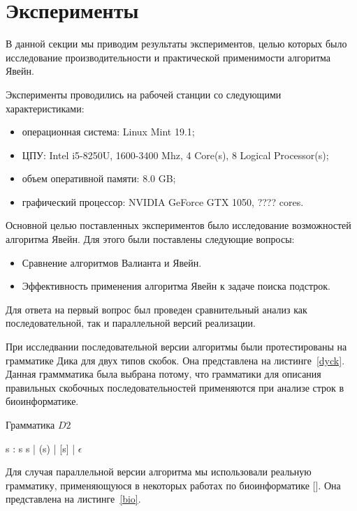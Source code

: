 \documentclass[14pt]{matmex-diploma-custom}
\begin{document}
\section{Эксперименты}

В данной секции мы приводим результаты экспериментов, целью которых было исследование производительности и практической применимости алгоритма Явейн.

Эксперименты проводились на рабочей станции со следующими характеристиками:
\begin{itemize}
    \item операционная система: Linux Mint 19.1;
    \item ЦПУ: Intel i5-8250U, 1600-3400 Mhz, 4 Core(s), 8 Logical Processor(s);
    \item объем оперативной памяти: 8.0 GB;
    \item графический процессор: NVIDIA GeForce GTX 1050, ???? cores.
\end{itemize}

Основной целью поставленных экспериментов было исследование возможностей алгоритма Явейн.
Для этого были поставлены следующие вопросы:

\begin{itemize}
    \item Сравнение алгоритмов Валианта и Явейн.
    \item Эффективность применения алгоритма Явейн к задаче поиска подстрок.
\end{itemize}

Для ответа на первый вопрос был проведен сравнительный анализ как последовательной, так и параллельной версий реализации. 

При исследвании последовательной версии алгоритмы были протестированы на грамматике Дика для двух типов скобок. Она представлена на листинге~\ref{dyck}. Данная граммматика была выбрана потому, что грамматики для описания правильных скобочных последовательностей применяются при анализе строк в биоинформатике. 

\begin{listing}
\caption{Грамматика $D2$}

\quad\quad\quad\quad\quad\quad\quad\quad\quad\quad\quad\quad s : s s  |  (s) |  [s]  |  $\epsilon$

\label{dyck}
\end{listing} 

Для случая параллельной версии алгоритма мы использовали реальную грамматику, применяющуюся в некоторых работах по биоинформатике []. Она представлена на листинге~\ref{bio}.
\end{document}
